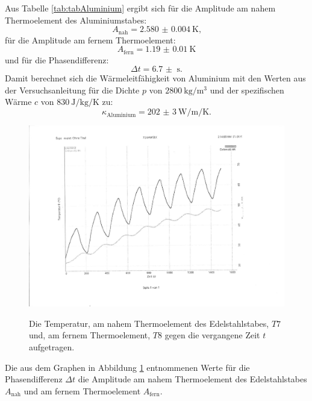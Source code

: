 Aus Tabelle \ref{tab:tabAluminium} ergibt sich für die Amplitude am nahem Thermoelement des Aluminiumstabes:
\begin{displaymath}
A_\text{nah} = \SI{2.580(4)}{\kelvin}\text{,}
\end{displaymath}
für die Amplitude am fernem Thermoelement:
\begin{displaymath}
A_\text{fern} = \SI{1.19(1)}{\kelvin}
\end{displaymath}
und für die Phasendifferenz:
\begin{displaymath}
\Delta t = \SI{6.7(0)}{\second}\text{.}
\end{displaymath}
Damit berechnet sich die Wärmeleitfähigkeit von Aluminium mit den Werten aus der Versuchsanleitung \cite{V204} für die Dichte $p$ von $\SI{2800}{\kilo\gram\per\meter\tothe{3}}$ und der spezifischen Wärme $c$ von $\SI{830}{\joule\per\kilo\gram\per\kelvin}$ zu:
\begin{displaymath}
\kappa_\text{Aluminium} = \SI{202(3)}{\watt\per\meter\per\kelvin}\text{.}
\end{displaymath}
\begin{figure}
	\centering
	\caption{Die Temperatur, am nahem Thermoelement des Edelstahlstabes, $T7$ und, am fernem Thermoelement, $T8$ gegen die vergangene Zeit $t$ aufgetragen.}
	\includegraphics[width=\linewidth-70pt,height=\textheight-70pt,keepaspectratio]{content/Bilder/T7T8-rotated.pdf}
	\label{fig:Graph7}
\end{figure}
\begin{table}
	\centering
	\caption{Die aus dem Graphen in Abbildung \ref{fig:Graph7} entnommenen Werte für die Phasendifferenz $\Delta t$ die Amplitude am nahem Thermoelement des Edelstahlstabes $A_\text{nah}$ und am fernem Thermoelement $A_\text{fern}$.}
	
\end{table}

